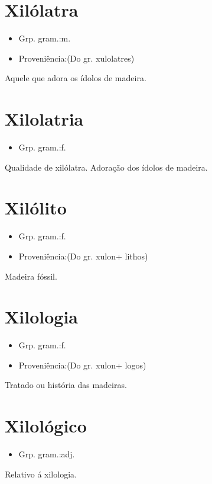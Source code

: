 \section{Xilólatra}
\begin{itemize}
\item {Grp. gram.:m.}
\end{itemize}
\begin{itemize}
\item {Proveniência:(Do gr. \textunderscore xulolatres\textunderscore )}
\end{itemize}
Aquele que adora os ídolos de madeira.
\section{Xilolatria}
\begin{itemize}
\item {Grp. gram.:f.}
\end{itemize}
Qualidade de xilólatra.
Adoração dos ídolos de madeira.
\section{Xilólito}
\begin{itemize}
\item {Grp. gram.:f.}
\end{itemize}
\begin{itemize}
\item {Proveniência:(Do gr. \textunderscore xulon\textunderscore  + \textunderscore lithos\textunderscore )}
\end{itemize}
Madeira fóssil.
\section{Xilologia}
\begin{itemize}
\item {Grp. gram.:f.}
\end{itemize}
\begin{itemize}
\item {Proveniência:(Do gr. \textunderscore xulon\textunderscore  + \textunderscore logos\textunderscore )}
\end{itemize}
Tratado ou história das madeiras.
\section{Xilológico}
\begin{itemize}
\item {Grp. gram.:adj.}
\end{itemize}
Relativo á xilologia.
